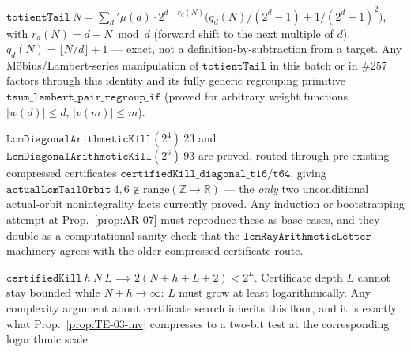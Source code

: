 \begin{prop}\label{prop:MP-01-inv}
$\mathtt{totientTail}\ N = \sum_d' \mu(d)\cdot 2^{d-r_d(N)}\big(q_d(N)/(2^d-1) + 1/(2^d-1)^2\big)$,
with $r_d(N)=d-N\bmod d$ (forward shift to the next multiple of $d$), $q_d(N)=\lfloor N/d\rfloor+1$ —
exact, not a definition-by-subtraction from a target. Any Möbius/Lambert-series manipulation of
$\mathtt{totientTail}$ in this batch or in \#257 factors through this identity and its fully
generic regrouping primitive $\mathtt{tsum\_lambert\_pair\_regroup\_if}$ (proved for arbitrary
weight functions $|w(d)|\le d$, $|v(m)|\le m$).
\ \ \\
\end{prop}

\begin{prop}\label{prop:SK-01-inv}
$\mathtt{LcmDiagonalArithmeticKill}(2^4)\ 23$ and $\mathtt{LcmDiagonalArithmeticKill}(2^6)\ 93$ are
proved, routed through pre-existing compressed certificates
$\mathtt{certifiedKill\_diagonal\_t16}/\mathtt{t64}$, giving $\mathtt{actualLcmTailOrbit}\ 4,6\notin\mathrm{range}(\mathbb Z\to\mathbb R)$
— the \emph{only} two unconditional actual-orbit nonintegrality facts currently proved. Any
induction or bootstrapping attempt at Prop.~\ref{prop:AR-07} must reproduce these as base cases,
and they double as a computational sanity check that the $\mathtt{lcmRayArithmeticLetter}$
machinery agrees with the older compressed-certificate route.
\ \ \\
\end{prop}

\begin{prop}\label{prop:A5-inv}
$\mathtt{certifiedKill}\ h\ N\ L \implies 2(N{+}h{+}L{+}2)<2^L$. Certificate depth $L$ cannot stay
bounded while $N{+}h\to\infty$: $L$ must grow at least logarithmically. Any complexity argument
about certificate search inherits this floor, and it is exactly what Prop.~\ref{prop:TE-03-inv}
compresses to a two-bit test at the corresponding logarithmic scale.
\ \ \\
\end{prop}

